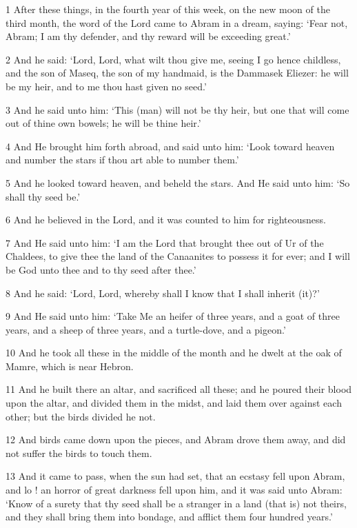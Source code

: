 \par 1 After these things, in the fourth year of this week, on the new moon of the third month, the word of the Lord came to Abram in a dream, saying: ‘Fear not, Abram; I am thy defender, and thy reward will be exceeding great.’
\par 2 And he said: ‘Lord, Lord, what wilt thou give me, seeing I go hence childless, and the son of Maseq, the son of my handmaid, is the Dammasek Eliezer: he will be my heir, and to me thou hast given no seed.’
\par 3 And he said unto him: ‘This (man) will not be thy heir, but one that will come out of thine own bowels; he will be thine heir.’
\par 4 And He brought him forth abroad, and said unto him: ‘Look toward heaven and number the stars if thou art able to number them.’
\par 5 And he looked toward heaven, and beheld the stars. And He said unto him: ‘So shall thy seed be.’
\par 6 And he believed in the Lord, and it was counted to him for righteousness.
\par 7 And He said unto him: ‘I am the Lord that brought thee out of Ur of the Chaldees, to give thee the land of the Canaanites to possess it for ever; and I will be God unto thee and to thy seed after thee.’
\par 8 And he said: ‘Lord, Lord, whereby shall I know that I shall inherit (it)?’
\par 9 And He said unto him: ‘Take Me an heifer of three years, and a goat of three years, and a sheep of three years, and a turtle-dove, and a pigeon.’
\par 10 And he took all these in the middle of the month and he dwelt at the oak of Mamre, which is near Hebron.
\par 11 And he built there an altar, and sacrificed all these; and he poured their blood upon the altar, and divided them in the midst, and laid them over against each other; but the birds divided he not.
\par 12 And birds came down upon the pieces, and Abram drove them away, and did not suffer the birds to touch them.
\par 13 And it came to pass, when the sun had set, that an ecstasy fell upon Abram, and lo ! an horror of great darkness fell upon him, and it was said unto Abram: ‘Know of a surety that thy seed shall be a stranger in a land (that is) not theirs, and they shall bring them into bondage, and afflict them four hundred years.’
